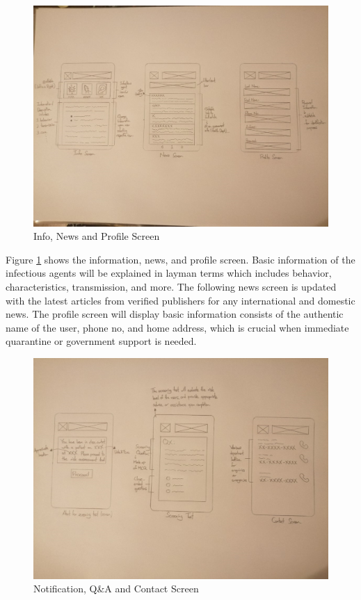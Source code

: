       \begin{figure}[H]
        \centering
        \includegraphics[width=\linewidth]{img/low-fidelity-prototype/sketch-2.png}
        \caption{Info, News and Profile Screen}
        \label{fig:prototype-02}
      \end{figure}

      \par Figure \ref{fig:prototype-02} shows the information, news, and profile screen. Basic information of the infectious agents will be explained in layman terms which includes behavior, characteristics, transmission, and more. The following news screen is updated with the latest articles from verified publishers for any international and domestic news. The profile screen will display basic information consists of the authentic name of the user, phone no, and home address, which is crucial when immediate quarantine or government support is needed.

      \begin{figure}[H]
        \centering
        \includegraphics[width=\linewidth]{img/low-fidelity-prototype/sketch-3.png}
        \caption{Notification, Q\&A and Contact Screen}
        \label{fig:prototype-03}
      \end{figure}
      
